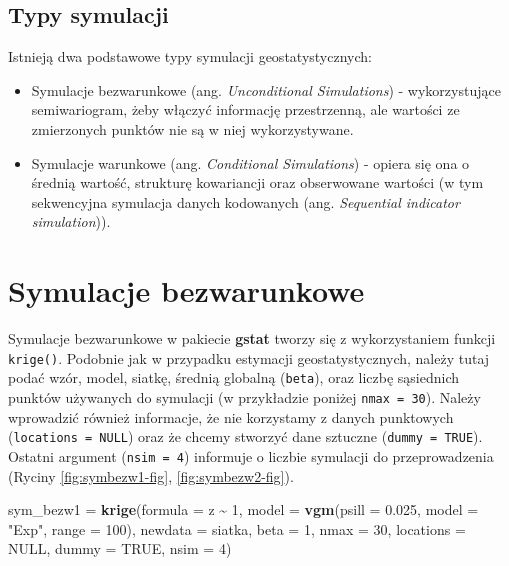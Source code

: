 \documentclass[
  paper=6in:9in,pagesize=pdftex,headinclude=on,footinclude=on,10pt]{scrbook}
\newenvironment{Shaded}{\begin{snugshade}}{\end{snugshade}}
\newcommand{\AttributeTok}[1]{\textcolor[rgb]{0.13,0.29,0.53}{#1}}
\newcommand{\ConstantTok}[1]{\textcolor[rgb]{0.56,0.35,0.01}{#1}}
\newcommand{\DecValTok}[1]{\textcolor[rgb]{0.00,0.00,0.81}{#1}}
\newcommand{\FloatTok}[1]{\textcolor[rgb]{0.00,0.00,0.81}{#1}}
\newcommand{\FunctionTok}[1]{\textcolor[rgb]{0.13,0.29,0.53}{\textbf{#1}}}
\newcommand{\NormalTok}[1]{#1}
\newcommand{\OtherTok}[1]{\textcolor[rgb]{0.56,0.35,0.01}{#1}}
\newcommand{\SpecialCharTok}[1]{\textcolor[rgb]{0.81,0.36,0.00}{\textbf{#1}}}
\newcommand{\StringTok}[1]{\textcolor[rgb]{0.31,0.60,0.02}{#1}}
\providecommand{\tightlist}{%
  \setlength{\itemsep}{0pt}\setlength{\parskip}{0pt}}
\begin{document}
\subsection{Typy symulacji}\label{typy-symulacji}

Istnieją dwa podstawowe typy symulacji geostatystycznych:

\begin{itemize}
\tightlist
\item
  Symulacje bezwarunkowe (ang. \emph{Unconditional Simulations}) - wykorzystujące semiwariogram, żeby włączyć informację przestrzenną, ale wartości ze zmierzonych punktów nie są w niej wykorzystywane.
\item
  Symulacje warunkowe (ang. \emph{Conditional Simulations}) - opiera się ona o średnią wartość, strukturę kowariancji oraz obserwowane wartości (w tym sekwencyjna symulacja danych kodowanych (ang. \emph{Sequential indicator simulation})).
\end{itemize}

\section{Symulacje bezwarunkowe}\label{symulacje-bezwarunkowe}

Symulacje bezwarunkowe w pakiecie \textbf{gstat} tworzy się z wykorzystaniem funkcji \texttt{krige()}.
Podobnie jak w przypadku estymacji geostatystycznych, należy tutaj podać wzór, model, siatkę, średnią globalną (\texttt{beta}), oraz liczbę sąsiednich punktów używanych do symulacji (w przykładzie poniżej \texttt{nmax\ =\ 30}).
Należy wprowadzić również informacje, że nie korzystamy z danych punktowych (\texttt{locations\ =\ NULL}) oraz że chcemy stworzyć dane sztuczne (\texttt{dummy\ =\ TRUE}).
Ostatni argument (\texttt{nsim\ =\ 4}) informuje o liczbie symulacji do przeprowadzenia (Ryciny \ref{fig:symbezw1-fig}, \ref{fig:symbezw2-fig}).

\begin{Shaded}
\begin{Highlighting}[]
\NormalTok{sym\_bezw1 }\OtherTok{=} \FunctionTok{krige}\NormalTok{(}\AttributeTok{formula =}\NormalTok{ z }\SpecialCharTok{\textasciitilde{}} \DecValTok{1}\NormalTok{, }
                   \AttributeTok{model =} \FunctionTok{vgm}\NormalTok{(}\AttributeTok{psill =} \FloatTok{0.025}\NormalTok{,}
                               \AttributeTok{model =} \StringTok{"Exp"}\NormalTok{, }
                               \AttributeTok{range =} \DecValTok{100}\NormalTok{), }
                   \AttributeTok{newdata =}\NormalTok{ siatka, }
                   \AttributeTok{beta =} \DecValTok{1}\NormalTok{,}
                   \AttributeTok{nmax =} \DecValTok{30}\NormalTok{,}
                   \AttributeTok{locations =} \ConstantTok{NULL}\NormalTok{, }
                   \AttributeTok{dummy =} \ConstantTok{TRUE}\NormalTok{, }
                   \AttributeTok{nsim =} \DecValTok{4}\NormalTok{)}
\end{Highlighting}
\end{Shaded}
\end{document}
